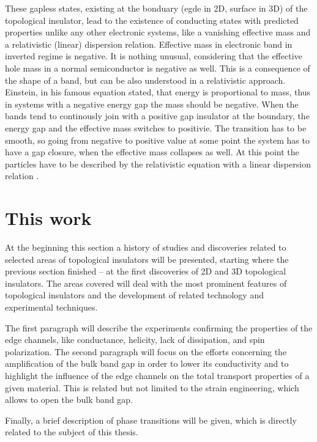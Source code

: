 \documentclass[titlepage,a4paper]{book}
\newcommand{\wciecie}{\quad\phantom{v}}
\begin{document}
These gapless states, existing at the bonduary (egde in 2D, surface in 3D) of the topological insulator, lead to the existence of conducting states with predicted properties unlike any other electronic systems, like a vanishing effective mass and a relativistic (linear) dispersion relation. Effective mass in electronic band in inverted regime is negative. It is nothing unusual, considering that the effective hole mass in a normal semiconductor is negative as well. This is a consequence of the shape of a band, but can be also understood in a relativistic approach. Einstein, in his famous equation stated, that energy is proportional to mass, thus in systems with a negative energy gap the mass should be negative. When the bands tend to continously join with a positive gap insulator at the boundary, the energy gap and the effective mass switches to positivie. The transition has to be smooth, so going from negative to positive value at some point the system has to have a gap closure, when the effective mass collapses as well. At this point the particles have to be described by the relativistic equation with a linear dispersion relation \cite{Zawadzki_Topology}.


\section{This work}
\wciecie
At the beginning this section a history of studies and discoveries related to selected areas of topological insulators will be presented, starting where the previous section finished -- at the first discoveries of 2D and 3D topological insulators. The areas covered will deal with the most prominent features of topological insulators and the development of related technology and experimental techniques. 

The first paragraph will describe the experiments confirming the properties of the edge channels, like conductance, helicity, lack of dissipation, and spin polarization. The second paragraph will focus on the efforts concerning the amplification of the bulk band gap in order to lower its conductivity and to highlight the influence of the edge channels on the total transport properties of a given material. This is related but not limited to the strain engineering, which allows to open the bulk band gap.

Finally, a brief description of phase transitions will be given, which is directly related to the subject of this thesis. 
\end{document}
